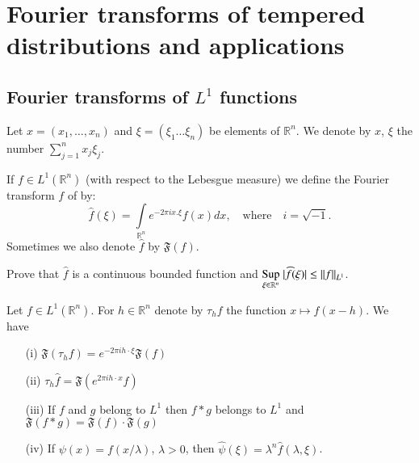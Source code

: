 \chapter{Fourier transforms of tempered distributions and
  applications}\label{chap4}


\setcounter{pageoriginal}{0}
\section*{Fourier transforms of $L^{1}$ functions}\pageoriginale

Let $x=(x_{1},\ldots,x_{n})$ and $\xi=(\xi_{1}\ldots\xi_{n})$ be
elements of $\mathbb{R}^{n}$. We denote by $x$, $\xi$ the number
$\sum\limits^{n}_{j=1}x_{j}\xi_{j}$. 

If $f\in L^{1}(\mathbb{R}^{n})$ (with respect to the Lebesgue measure)
we define the Fourier transform $f$ of by:
$$
\widehat{f}(\xi)=\int\limits_{\mathbb{R}^{n}}e^{-2\pi
  ix.\xi}f(x)dx,\quad\text{where}\quad i=\sqrt{-1}.
$$
Sometimes we also denote $\widehat{f}$ by $\mathfrak{F}(f)$.

\begin{exer*}
Prove that $\widehat{f}$ is a continuous bounded function and
$\displaystyle{\mathop{\operatorname{Sup}}\limits_{\xi\in \mathbb{R}^{n}}}\;|\widehat{f}(\xi)|\leq ||f||_{L^{1}}$.
\end{exer*}

\setcounter{proposition}{0}
\begin{proposition}\label{chap4-prop1}
Let $f\in L^{1}(\mathbb{R}^{n})$. For $h\in \mathbb{R}^{n}$ denote by
$\tau_{h}f$ the function $x\mapsto f(x-h)$. We have
\begin{itemize}
\item[\rm(i)] $\mathfrak{F}(\tau_{h}f)=e^{-2\pi ih\cdot
  \xi}\mathfrak{F}(f)$

\item[\rm(ii)] $\tau_{h}\widehat{f}=\mathfrak{F}(e^{2\pi ih\cdot x}f)$

\item[\rm(iii)] If $f$ and $g$ belong to $L^{1}$ then $f\ast g$
  belongs to $L^{1}$ and $\mathfrak{F}(f\ast g)=\mathfrak{F}(f)\cdot
  \mathfrak{F}(g)$

\item[\rm(iv)] If $\psi(x)=f(x/\lambda)$, $\lambda >0$, then $\widehat{\psi}(\xi)=\lambda^{n}\widehat{f}(\lambda,\xi)$.
\end{itemize}
\end{proposition}

